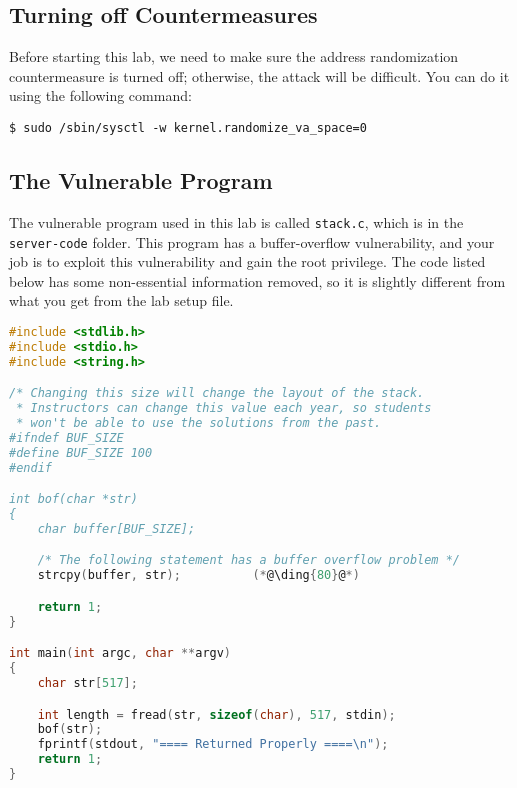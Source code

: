 \subsection{Turning off Countermeasures} 

Before starting this lab, we need to make sure the 
address randomization countermeasure is turned off; otherwise, the 
attack will be difficult. 
You can do it using the following command:

\begin{lstlisting}
$ sudo /sbin/sysctl -w kernel.randomize_va_space=0
\end{lstlisting}
 

\subsection{The Vulnerable Program} 
\label{sec:vulnerable_program}

The vulnerable program used in this lab is called
\texttt{stack.c}, which is in the \texttt{server-code} folder.
This program has a buffer-overflow vulnerability,
and your job is to exploit this vulnerability and gain the root privilege.
The code listed below has some non-essential information removed,
so it is slightly different from what you get from the lab setup file.

\begin{lstlisting}[language=C, caption={The vulnerable program \texttt{stack.c}}]
#include <stdlib.h>
#include <stdio.h>
#include <string.h>

/* Changing this size will change the layout of the stack.
 * Instructors can change this value each year, so students
 * won't be able to use the solutions from the past.
#ifndef BUF_SIZE
#define BUF_SIZE 100
#endif

int bof(char *str)
{
    char buffer[BUF_SIZE];

    /* The following statement has a buffer overflow problem */ 
    strcpy(buffer, str);          (*@\ding{80}@*)

    return 1;
}

int main(int argc, char **argv)
{
    char str[517];

    int length = fread(str, sizeof(char), 517, stdin);
    bof(str);
    fprintf(stdout, "==== Returned Properly ====\n");
    return 1;
}
\end{lstlisting}

